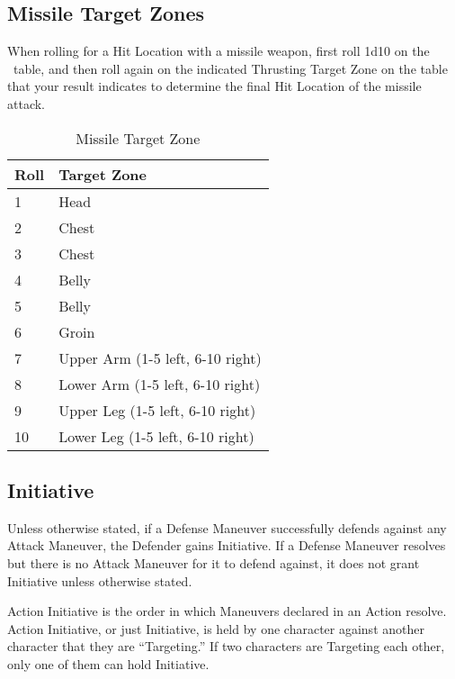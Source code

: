 \documentclass[oneside,11pt,english]{book}
\begin{document}
\subsection{Missile Target Zones}
When rolling for a Hit Location with a missile weapon, first roll 1d10 on the
~table, and then roll again on the indicated
Thrusting Target Zone on the  table that your result
indicates to determine the final Hit Location of the missile attack. 
\begin{table}[!ht]
  \centering
  \caption{Missile Target Zone}
  \label{tab:Missile Target Zones}
  \begin{tabu} spread 0pt {X[-1,c]X[2]}
    Roll&Target Zone\\&Head\\ %
    2&Chest\\
    3&Chest\\
    4&Belly\\
    5&Belly\\
    6&Groin\\
    7&Upper Arm\newline
    (1-5 left, 6-10 right)\\
    8&Lower Arm \newline
    (1-5 left, 6-10 right)\\
    9&Upper Leg \newline
    (1-5 left, 6-10 right)\\
    10&Lower Leg \newline
    (1-5 left, 6-10 right)\\
  \end{tabu}
\end{table}

\subsection{Initiative}
Unless otherwise stated, if a Defense Maneuver successfully defends against any Attack
Maneuver, the Defender gains Initiative. If a Defense Maneuver resolves but there is no Attack
Maneuver for it to defend against, it does not grant Initiative unless otherwise stated.

Action Initiative is the order in which Maneuvers declared in an Action resolve. Action Initiative, or just Initiative, is held by one character against another character that they are
``Targeting.'' If two characters are Targeting each other, only one of them can hold
Initiative.
\end{document}
